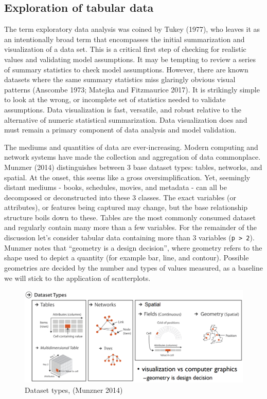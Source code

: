 \documentclass[11,]{article}
\begin{document}
\hypertarget{exploration-of-tabular-data}{%
\subsection{Exploration of tabular data}\label{exploration-of-tabular-data}}

The term exploratory data analysis was coined by Tukey (1977), who leaves it as an intentionally broad term that encompasses the initial summarization and visualization of a data set. This is a critical first step of checking for realistic values and validating model assumptions. It may be tempting to review a series of summary statistics to check model assumptions. However, there are known datasets where the same summary statistics miss glaringly obvious visual patterns (Anscombe 1973; Matejka and Fitzmaurice 2017). It is strikingly simple to look at the wrong, or incomplete set of statistics needed to validate assumptions. Data visualization is fast, versatile, and robust relative to the alternative of numeric statistical summarization. Data visualization does and must remain a primary component of data analysis and model validation.

The mediums and quantities of data are ever-increasing. Modern computing and network systems have made the collection and aggregation of data commonplace. Munzner (2014) distinguishes between 3 base dataset types: tables, networks, and spatial. At the onset, this seems like a gross oversimplification. Yet, seemingly distant mediums - books, schedules, movies, and metadata - can all be decomposed or deconstructed into these 3 classes. The exact variables (or attributes), or features being captured may change, but the base relationship structure boils down to these. Tables are the most commonly consumed dataset and regularly contain many more than a few variables. For the remainder of the discussion let's consider tabular data containing more than 3 variables (\texttt{p\ \textgreater{}\ 2}). Munzner notes that ``geometry is a design decision'', where geometry refers to the shape used to depict a quantity (for example bar, line, and contour). Possible geometries are decided by the number and types of values measured, as a baseline we will stick to the application of scatterplots.

\begin{figure}

{\centering \includegraphics[width=1\linewidth]{figures/tmunzner_vad16} 

}

\caption{Dataset types, (Munzner 2014)}\label{fig:datasetTypes}
\end{figure}
\end{document}

